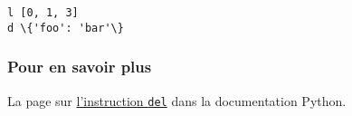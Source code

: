     \begin{Verbatim}[commandchars=\\\{\}]
l [0, 1, 3]
d \{'foo': 'bar'\}

    \end{Verbatim}

    \hypertarget{pour-en-savoir-plus}{%
\subsubsection{Pour en savoir plus}\label{pour-en-savoir-plus}}

    La page sur
\href{https://docs.python.org/3/reference/simple_stmts.html\#the-del-statement}{l'instruction
\texttt{del}} dans la documentation Python.